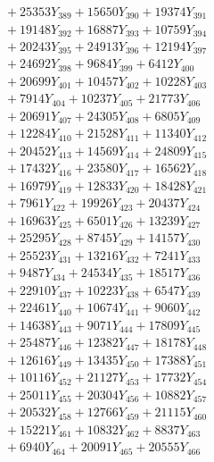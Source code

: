 \documentclass[a4paper,10pt]{article}
\begin{document}
{\begin{align}
&\;  + 25353 Y_{389} + 15650 Y_{390} + 19374 Y_{391} \\[0.3ex]
&\;  + 19148 Y_{392} + 16887 Y_{393} + 10759 Y_{394} \\[0.3ex]
&\;  + 20243 Y_{395} + 24913 Y_{396} + 12194 Y_{397} \\[0.3ex]
&\;  + 24692 Y_{398} + 9684 Y_{399} + 6412 Y_{400} \\[0.3ex]
&\;  + 20699 Y_{401} + 10457 Y_{402} + 10228 Y_{403} \\[0.3ex]
&\;  + 7914 Y_{404} + 10237 Y_{405} + 21773 Y_{406} \\[0.3ex]
&\;  + 20691 Y_{407} + 24305 Y_{408} + 6805 Y_{409} \\[0.3ex]
&\;  + 12284 Y_{410} + 21528 Y_{411} + 11340 Y_{412} \\[0.3ex]
&\;  + 20452 Y_{413} + 14569 Y_{414} + 24809 Y_{415} \\[0.3ex]
&\;  + 17432 Y_{416} + 23580 Y_{417} + 16562 Y_{418} \\[0.5ex]\allowbreak
&\;  + 16979 Y_{419} + 12833 Y_{420} + 18428 Y_{421} \\[0.3ex]
&\;  + 7961 Y_{422} + 19926 Y_{423} + 20437 Y_{424} \\[0.3ex]
&\;  + 16963 Y_{425} + 6501 Y_{426} + 13239 Y_{427} \\[0.3ex]
&\;  + 25295 Y_{428} + 8745 Y_{429} + 14157 Y_{430} \\[0.3ex]
&\;  + 25523 Y_{431} + 13216 Y_{432} + 7241 Y_{433} \\[0.3ex]
&\;  + 9487 Y_{434} + 24534 Y_{435} + 18517 Y_{436} \\[0.3ex]
&\;  + 22910 Y_{437} + 10223 Y_{438} + 6547 Y_{439} \\[0.3ex]
&\;  + 22461 Y_{440} + 10674 Y_{441} + 9060 Y_{442} \\[0.3ex]
&\;  + 14638 Y_{443} + 9071 Y_{444} + 17809 Y_{445} \\[0.3ex]
&\;  + 25487 Y_{446} + 12382 Y_{447} + 18178 Y_{448} \\[0.5ex]\allowbreak
&\;  + 12616 Y_{449} + 13435 Y_{450} + 17388 Y_{451} \\[0.3ex]
&\;  + 10116 Y_{452} + 21127 Y_{453} + 17732 Y_{454} \\[0.3ex]
&\;  + 25011 Y_{455} + 20304 Y_{456} + 10882 Y_{457} \\[0.3ex]
&\;  + 20532 Y_{458} + 12766 Y_{459} + 21115 Y_{460} \\[0.3ex]
&\;  + 15221 Y_{461} + 10832 Y_{462} + 8837 Y_{463} \\[0.3ex]
&\;  + 6940 Y_{464} + 20091 Y_{465} + 20555 Y_{466} \\[0.3ex]

\end{align}}
\end{document}
